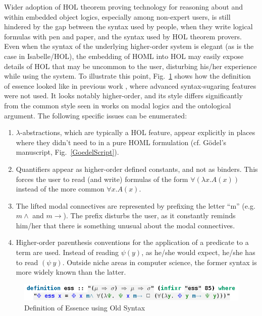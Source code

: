 \documentclass{article}
\newcommand{\imp}{{\rightarrow}}
\begin{document}
Wider adoption of HOL theorem proving technology for
reasoning about and within embedded object logics, especially among
non-expert users, is still hindered by the gap between the syntax used
by people, when they write logical formulas with pen and paper, and
the syntax used by HOL theorem provers. Even when the syntax of the
underlying higher-order system is elegant (as is the case in
Isabelle/HOL), the embedding of HOML into HOL may easily expose
details of HOL that may be uncommon to the user, disturbing his/her
experience while using the system. To illustrate this point,
Fig.~\ref{UglyEssence} shows how the definition of essence looked like
in previous work \cite{J28}, where advanced syntax-sugaring features
were not used. It looks notably higher-order, and its style differs
significantly from the common style seen in works on modal logics and
the ontological argument. The following specific issues can be
enumerated:
\begin{enumerate}
\item $\lambda$-abstractions, which are typically a HOL feature, appear explicitly in places where they didn't need to in a pure HOML formulation (cf. G\"odel's manuscript, Fig.~\ref{GoedelScript}).
\item Quantifiers appear as higher-order defined constants, and not as binders. This forces the user to read (and write) formulas of the form $\forall (\lambda x. A(x))$ instead of the more common $\forall x. A(x)$.
\item The lifted modal connectives are represented by prefixing the
  letter ``m'' (e.g. $m\wedge$ and $m\imp$). The prefix disturbs the
  user, as it constantly reminds him/her that there is something
  unusual about the modal connectives.
\item Higher-order parenthesis conventions for the application of a predicate to a term are used. 
Instead of reading $\psi(y)$, as he/she would expect, he/she has to read $(\psi ~ y)$. Outside niche areas in computer science, the former syntax is more widely known than the latter.
\end{enumerate}


\begin{figure}
\centerline{\includegraphics[width=1\columnwidth]{./Images/UglyEssence.png}}
\caption{Definition of Essence using Old Syntax} \label{UglyEssence}
\end{figure}
\end{document}
